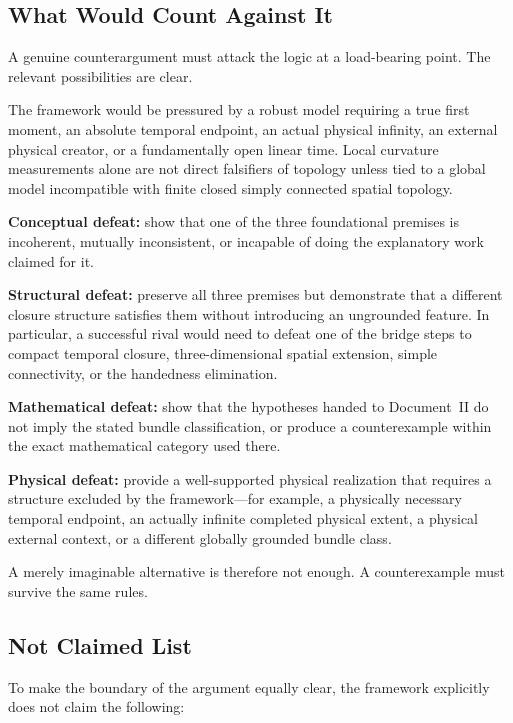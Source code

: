 \documentclass[11pt]{article}
\theoremstyle{canonstyle}
\begin{document}
\subsection{What Would Count Against It}

A genuine counterargument must attack the logic at a load-bearing point. The relevant possibilities are clear.

The framework would be pressured by a robust model requiring a true first moment, an absolute temporal endpoint, an actual physical infinity, an external physical creator, or a fundamentally open linear time. Local curvature measurements alone are not direct falsifiers of topology unless tied to a global model incompatible with finite closed simply connected spatial topology.

\textbf{Conceptual defeat:} show that one of the three foundational premises is incoherent, mutually inconsistent, or incapable of doing the explanatory work claimed for it.

\textbf{Structural defeat:} preserve all three premises but demonstrate that a different closure structure satisfies them without introducing an ungrounded feature. In particular, a successful rival would need to defeat one of the bridge steps to compact temporal closure, three-dimensional spatial extension, simple connectivity, or the handedness elimination.

\textbf{Mathematical defeat:} show that the hypotheses handed to Document~II do not imply the stated bundle classification, or produce a counterexample within the exact mathematical category used there.

\textbf{Physical defeat:} provide a well-supported physical realization that requires a structure excluded by the framework---for example, a physically necessary temporal endpoint, an actually infinite completed physical extent, a physical external context, or a different globally grounded bundle class.

A merely imaginable alternative is therefore not enough. A counterexample must survive the same rules.

\newpage
\subsection{Not Claimed List}

To make the boundary of the argument equally clear, the framework explicitly does not claim the following:
\end{document}
